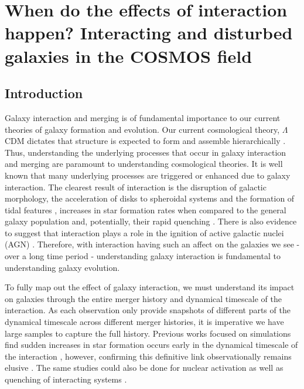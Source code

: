 \chapter{When do the effects of interaction happen? Interacting and disturbed galaxies in the COSMOS field}\label{chapter3}



\section{Introduction}\label{introduction}
\noindent Galaxy interaction and merging is of fundamental importance to our current theories of galaxy formation and evolution. Our current cosmological theory, $\Lambda$CDM dictates that structure is expected to form and assemble hierarchically \citep{1978MNRAS.183..341W, 2001MNRAS.328..726S, 2013MNRAS.436.1765M}. Thus, understanding the underlying processes that occur in galaxy interaction and merging are paramount to understanding cosmological theories. It is well known that many underlying processes are triggered or enhanced due to galaxy interaction. The clearest result of interaction is the disruption of galactic morphology, the acceleration of disks to spheroidal systems and the formation of tidal features \citep{1972ApJ...178..623T, 1977ApJ...212..616T, 2005MNRAS.357..753G, 2009MNRAS.397..802H}, increases in star formation rates when compared to the general galaxy population \citep{1991ApJ...370L..65B, 2006ApJ...652...56B, 2014MNRAS.437.2137S, 2015ApJ...807L..16K} and, potentially, their rapid quenching \citep{2013MNRAS.430.1901H, 2023RAA....23i5026D}. There is also evidence to suggest that interaction plays a role in the ignition of active galactic nuclei (AGN) \citep{2011MNRAS.418.2043E, 2015ApJ...806..219C, 2023MNRAS.523.4164H}. Therefore, with interaction having such an affect on the galaxies we see - over a long time period - understanding galaxy interaction is fundamental to understanding galaxy evolution.

To fully map out the effect of galaxy interaction, we must understand its impact on galaxies through the entire merger history and dynamical timescale of the interaction. As each observation only provide snapshots of different parts of the dynamical timescale across different merger histories, it is imperative we have large samples to capture the full history. Previous works focused on simulations find sudden increases in star formation occurs early in the dynamical timescale of the interaction \citep{2008MNRAS.384..386C, 2019MNRAS.490.2139R}, however, confirming this definitive link observationally remains elusive \citep{2023ApJ...958...96R}. The same studies could also be done for nuclear activation as well as quenching of interacting systems \citep{2011MNRAS.418.2043E, 2018PASJ...70S..37G, 2023ApJ...942..107S}. 

